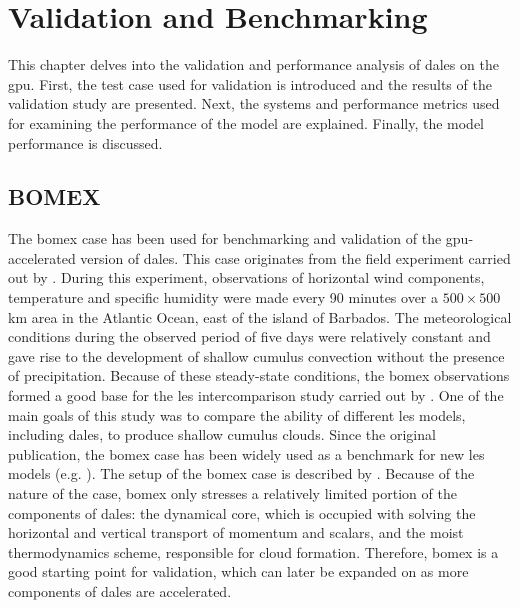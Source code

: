 \chapter{Validation and Benchmarking} \label{chap:val_bench}
This chapter delves into the validation and performance analysis of \acrshort{dales} on the \acrshort{gpu}. First, the test case used for validation is introduced and the results of the validation study are presented. Next, the systems and performance metrics used for examining the performance of the model are explained. Finally, the model performance is discussed.

\section{BOMEX}
The \acrfull{bomex} case has been used for benchmarking and validation of the \acrshort{gpu}-accelerated version of \acrshort{dales}. This case originates from the field experiment carried out by \citet{hollandMeasurementsAtmosphericMass1973}. During this experiment, observations of horizontal wind components, temperature and specific humidity were made every 90 minutes over a $500 \times 500$ km area in the Atlantic Ocean, east of the island of Barbados. The meteorological conditions during the observed period of five days were relatively constant and gave rise to the development of shallow cumulus convection without the presence of precipitation. Because of these steady-state conditions, the \acrshort{bomex} observations formed a good base for the \acrshort{les} intercomparison study carried out by \citet{siebesmaLargeEddySimulation2003}. One of the main goals of this study was to compare the ability of different \acrshort{les} models, including \acrshort{dales}, to produce shallow cumulus clouds. Since the original publication, the \acrshort{bomex} case has been widely used as a benchmark for new \acrshort{les} models (e.g. \citet{vanheerwaardenMicroHHComputationalFluid2017}). The setup of the \acrshort{bomex} case is described by \citet{siebesmaEvaluationParametricAssumptions1995}. Because of the nature of the case, \acrshort{bomex} only stresses a relatively limited portion of the components of \acrshort{dales}: the dynamical core, which is occupied with solving the horizontal and vertical transport of momentum and scalars, and the moist thermodynamics scheme, responsible for cloud formation. Therefore, \acrshort{bomex} is a good starting point for validation, which can later be expanded on as more components of \acrshort{dales} are accelerated.

